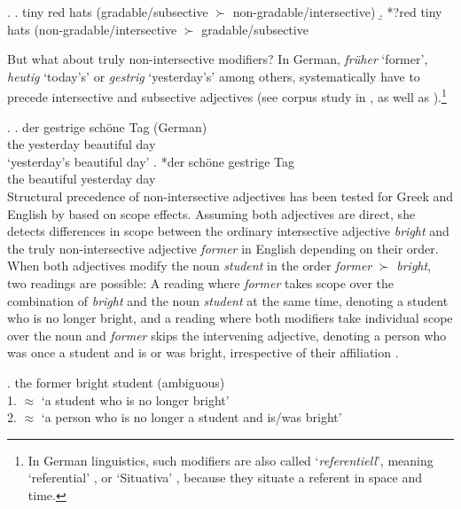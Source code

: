 \documentclass [output=book,colorlinks,citecolor=brown]{langscibook}
\begin{document}
\newpage

\ex. \a. tiny red hats (gradable/subsective $\succ$ non-gradable/intersective)
\b. *?red tiny hats (non-gradable/intersective $\succ$ gradable/subsective \\ \null \hfill\citep[36]{svenonius:2008:position}

But what about truly non-intersective modifiers? In German, \textit{früher} `former’, \textit{heutig} `today's' or \textit{gestrig} `yesterday’s’ among others, systematically have to precede intersective and subsective adjectives (see corpus study in \citealt{trost:2006:das}, as well as \citealt{eichinger:1991:ganz}).\footnote{In German linguistics, such modifiers are also called `\textit{referentiell}', meaning `referential’ \citep{trost:2006:das}, or `Situativa' \citep{eichinger:1979:syntaktische, eichinger:1991:ganz}, because they situate a referent in space and time.} %

\ex. \ag. der gestrige schöne Tag (German)\\
the yesterday beautiful day\\
`yesterday's beautiful day'
\bg. *der schöne gestrige Tag\\
the beautiful yesterday day\\

Structural precedence of non-intersective adjectives has been tested for Greek and English by \citet{panayidou:2013:in} based on scope effects. Assuming both adjectives are direct, she detects differences in scope between the ordinary intersective adjective \textit{bright} and the truly non-intersective adjective \textit{former} in English depending on their order. When both adjectives modify the noun \textit{student} in the order \textit{former} $\succ$ \textit{bright}, two readings are possible: A reading where \textit{former} takes scope over the combination of \textit{bright} and the noun \textit{student} at the same time, denoting a student who is no longer bright, and a reading where both modifiers take individual scope over the noun and \textit{former} skips the intervening adjective, denoting a person who was once a student and is or was bright, irrespective of their affiliation \citep[106]{panayidou:2013:in}. %

\ex. the former bright student (ambiguous)\\
1. $\approx$ `a student who is no longer bright’\\
2. $\approx$ `a person who is no longer a student and is/was bright’
\end{document}
